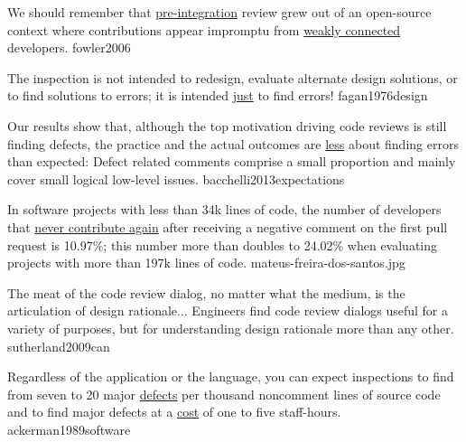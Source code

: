 \documentclass{article}
\begin{document}


  {We should remember that \ul{pre-integration} review grew out of an open-source context where contributions appear impromptu from \ul{weakly connected} developers.}
  {fowler2006}


%




  {The inspection is not intended to redesign, evaluate alternate design solutions, or to find solutions to errors; it is intended \ul{just} to find errors!}
  {fagan1976design}

  {Our results show that, although the top motivation driving code reviews is still finding defects, the practice and the actual outcomes are \ul{less} about finding errors than expected: Defect related comments comprise a small proportion and mainly cover small logical low-level issues.}
  {bacchelli2013expectations}

  {In software projects with less than 34k lines of code, the number of developers that \ul{never contribute again} after receiving a negative comment on the first pull request is 10.97\%; this number more than doubles to 24.02\% when evaluating projects with more than 197k lines of code.}
  {mateus-freira-dos-santos.jpg}

  {The meat of the code review dialog, no matter what the medium, is the articulation of design rationale... Engineers find code review dialogs useful for a variety of purposes, but for understanding design rationale more than any other.}
  {sutherland2009can}

  {Regardless of the application or the language, you can expect inspections to find from seven to 20 major \ul{defects} per thousand noncomment lines of source code and to find major defects at a \ul{cost} of one to five staff-hours.}
  {ackerman1989software}
\end{document}
